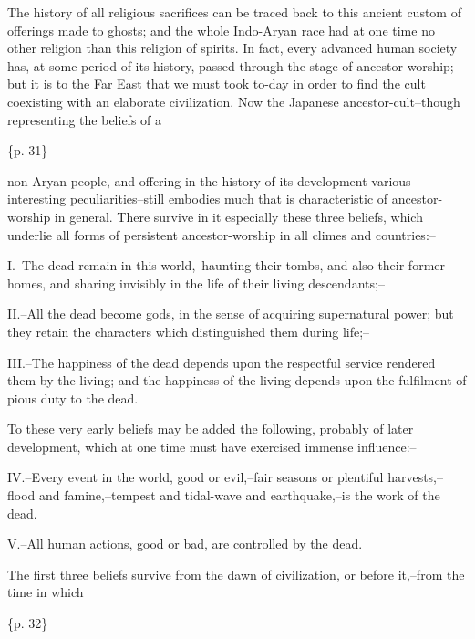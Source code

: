 The history of all religious sacrifices can be traced back to this ancient custom of offerings made to ghosts; and the whole Indo-Aryan race had at one time no other religion than this religion of spirits. In fact, every advanced human society has, at some period of its history, passed through the stage of ancestor-worship; but it is to the Far East that we must took to-day in order to find the cult coexisting with an elaborate civilization. Now the Japanese ancestor-cult--though representing the beliefs of a

\{p. 31\}

non-Aryan people, and offering in the history of its development various interesting peculiarities--still embodies much that is characteristic of ancestor-worship in general. There survive in it especially these three beliefs, which underlie all forms of persistent ancestor-worship in all climes and countries:--

I.--The dead remain in this world,--haunting their tombs, and also their former homes, and sharing invisibly in the life of their living descendants;--

II.--All the dead become gods, in the sense of acquiring supernatural power; but they retain the characters which distinguished them during life;--

III.--The happiness of the dead depends upon the respectful service rendered them by the living; and the happiness of the living depends upon the fulfilment of pious duty to the dead.



To these very early beliefs may be added the following, probably of later development, which at one time must have exercised immense influence:--

IV.--Every event in the world, good or evil,--fair seasons or plentiful harvests,--flood and famine,--tempest and tidal-wave and earthquake,--is the work of the dead.

V.--All human actions, good or bad, are controlled by the dead.



The first three beliefs survive from the dawn of civilization, or before it,--from the time in which

\{p. 32\}


